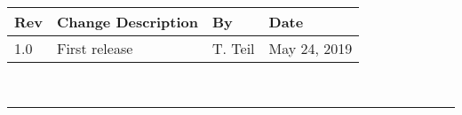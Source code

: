 \documentclass[]{BasiliskReportMemo}
\begin{document}
\makeCover

%
%
\pagestyle{empty}
{\renewcommand{\arraystretch}{2}
\noindent
\begin{longtable}{|p{0.5in}|p{3.5in}|p{1.07in}|p{0.9in}|}
\hline
{\bfseries Rev} & {\bfseries Change Description} & {\bfseries By}& {\bfseries Date} \\
\hline
1.0 & First release & T. Teil & May 24, 2019\\
\hline

\end{longtable}
}



\newpage
\setcounter{page}{1}
\pagestyle{fancy}

\tableofcontents %
~\\ \hrule ~\\ %










	









\end{document}
